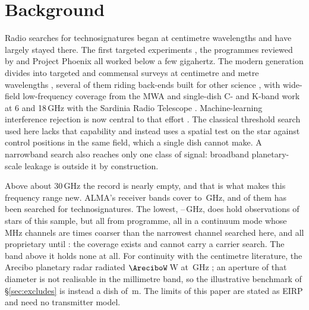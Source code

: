 \section{Background}
\label{sec:background}

Radio searches for technosignatures began at centimetre wavelengths and
have largely stayed there. The first targeted experiments
\citep{CocconiMorrison1959,Drake1960}, the programmes reviewed by
\citet{Tarter2001} and Project Phoenix \citep{Backus2002} all worked
below a few gigahertz. The modern generation divides into targeted and
commensal surveys at centimetre and metre wavelengths
\citep{Zhang2020,Czech2021,FAST3IATLAS2025,LOFARdualsite2023,Choza2024},
several of them riding back-ends built for other science
\citep{Morrison2023}, with wide-field low-frequency coverage from the MWA
\citep{Tremblay2024}
and single-dish C- and K-band work at 6 and 18\,GHz with the Sardinia
Radio Telescope \citep{SRT2025}. Machine-learning interference rejection
is now central to that effort
\citep{Ma2023,GLOBULAR2025,AnomalyParkesGBT2025}. The classical threshold
search used here lacks that capability and instead uses a spatial test on
the star against control positions in the same field, which a single dish
cannot make. A narrowband search also reaches only one class of signal:
broadband planetary-scale leakage \citep{BRaTs2026} is outside it by
construction.

Above about 30\,GHz the record is nearly empty, and that is what makes
this frequency range new. ALMA's \SbNBand{} receiver bands cover
\SbBandLoGHz{} to \SbBandHiGHz\,GHz, and \SbNPriorBandWord{} of them has
been searched for technosignatures. The lowest,
\SbBandOneLoGHz--\SbBandOneHiGHz\,GHz, does hold observations of
\SbBoneNStar{} stars of this sample, but all from \SbBoneNProgWord{}
programme, all in a
continuum mode whose \SbBoneChanMHz\,MHz channels are \SbBoneChanRatio{}
times coarser than the narrowest channel searched here, and all
proprietary until \SbBoneRelYear: the coverage exists and cannot carry a
carrier search. The band above it holds none at all. For continuity with
the centimetre literature, the Arecibo planetary radar radiated
$\AreciboW$\,W at \ArecGHz\,GHz \citep{EarthDetectingEarth2025}; an
aperture of that diameter is not realisable in the millimetre band, so the
illustrative benchmark of \S\ref{sec:excludes} is instead a dish of
\BenchDiam\,m. The limits of this paper are stated as EIRP and need no
transmitter model.

